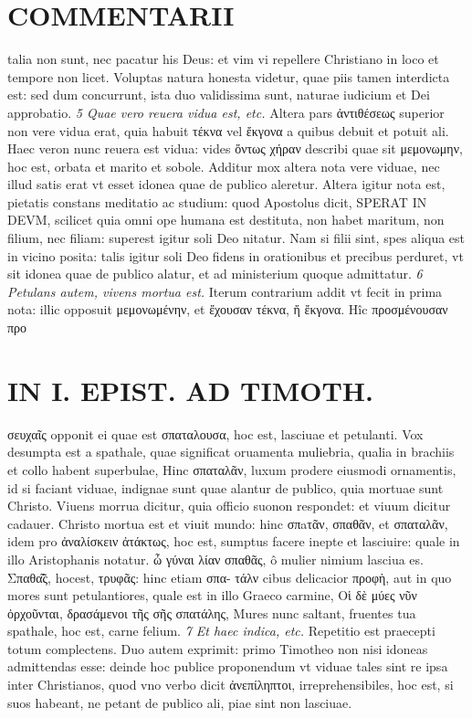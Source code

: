 \documentclass{article}
\begin{document}
\begin{pages}
\section*{COMMENTARII }
\marginpar{[ p.124 ]}\pstart talia non sunt, nec pacatur his Deus: et vim vi repellere Christiano in loco et tempore non licet. Voluptas natura honesta videtur, quae piis tamen interdicta est: sed dum concurrunt, ista duo validissima sunt, naturae iudicium et Dei approbatio.  \pend
\textit{5 Quae vero reuera vidua est, etc. }\pstart Altera pars ἀντιθέσεως superior non vere vidua erat, quia habuit τέκνα vel ἔκγονα a quibus debuit et potuit ali. Haec veron nunc reuera est vidua: vides ὄντως χήραν describi quae sit μεμονωμην, hoc est, orbata et marito et sobole. Additur mox altera nota vere viduae, nec illud satis erat vt esset idonea quae de publico aleretur. Altera igitur nota est, pietatis constans meditatio ac studium: quod Apostolus dicit, SPERAT IN DEVM, scilicet quia omni ope humana est destituta, non habet maritum, non filium, nec filiam: superest igitur soli Deo nitatur. Nam si filii sint, spes aliqua est in vicino posita: talis igitur soli Deo fidens in orationibus et precibus perduret, vt sit idonea quae de publico alatur, et ad ministerium quoque admittatur.  \pend
\textit{6 Petulans autem, vivens mortua est. }\pstart Iterum contrarium addit vt fecit in prima nota: illic opposuit μεμονωμένην, et ἔχουσαν τέκνα, ἤ ἔκγονα.  Hîc προσμένουσαν προ\pend
\section*{IN I. EPIST. AD TIMOTH. }
\marginpar{[ p.125 ]}\pstart σευχαῖς opponit ei quae est σπαταλουσα, hoc est, lasciuae et petulanti. Vox desumpta est a spathale, quae significat oruamenta muliebria, qualia in brachiis et collo habent superbulae, Hinc σπαταλᾶν, luxum prodere eiusmodi ornamentis, id si faciant viduae, indignae sunt quae alantur de publico, quia mortuae sunt Christo. Viuens morrua dicitur, quia officio suonon respondet: et viuum dicitur cadauer. Christo mortua est et viuit mundo: hinc σπaτᾶν, σπαθᾶν, et σπαταλᾶν, idem pro ἀναλίσκειν ἀτάκτως, hoc est, sumptus facere inepte et lasciuire: quale in illo Aristophanis notatur. ὦ γύναι λίαν σπαθᾶς, ô mulier nimium lasciua es. Σπαθα̃͂ς, hocest, τρυφᾶς: hinc etiam σπα- τάλν cibus delicacior προφὴ, aut in quo mores sunt petulantiores, quale est in illo Graeco carmine, Οἱ δὲ μύες νῦν ὀρχοῦνται, δρασάμενοι τῆς σῆς σπατάλης, Mures nunc saltant, fruentes tua spathale, hoc est, carne felium.  \pend
\textit{7 Et haec indica, etc. }\pstart Repetitio est praecepti totum complectens. Duo autem exprimit: primo Timotheo non nisi idoneas admittendas esse: deinde hoc publice proponendum vt viduae tales sint re ipsa inter Christianos, quod vno verbo dicit ἀνεπίληπτοι, irreprehensibiles, hoc est, si suos habeant, ne petant de publico ali, piae sint non lasciuae.  \pend

\end{pages}
\end{document}
